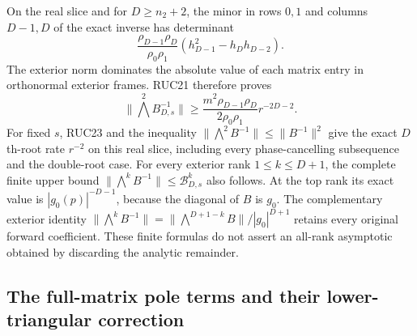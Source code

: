 On the real slice and for $D\ge n_2+2$, the minor in rows $0,1$
and columns $D-1,D$ of the exact inverse has determinant
\[
 \frac{\rho_{D-1}\rho_D}{\rho_0\rho_1}
                (h_{D-1}^2-h_Dh_{D-2}).
\]
The exterior norm dominates the absolute value of each matrix
entry in orthonormal exterior frames.  RUC21 therefore proves
\[
 \|\bigwedge^2B_{D,s}^{-1}\|
 \ge\frac{m^2\rho_{D-1}\rho_D}{2\rho_0\rho_1}
                  r^{-2D-2}.
 \tag{RUC25}
\]
For fixed $s$, RUC23 and the inequality
$\|\bigwedge^2B^{-1}\|\le\|B^{-1}\|^2$ give the exact
$D$th-root rate $r^{-2}$ on this real slice, including every
phase-cancelling subsequence and the double-root case.
For every exterior rank $1\le k\le D+1$, the complete finite
upper bound $\|\bigwedge^k B^{-1}\|\le\mathcal B_{D,s}^k$
also follows.  At the top rank its exact value is
$|g_0(p)|^{-D-1}$, because the diagonal of $B$ is $g_0$.
The complementary exterior identity
$\|\bigwedge^kB^{-1}\|=
\|\bigwedge^{D+1-k}B\|/|g_0|^{D+1}$
retains every original forward coefficient.  These finite
formulas do not assert an all-rank asymptotic obtained by
discarding the analytic remainder.

\subsection{The full-matrix pole terms and their lower-triangular correction}

